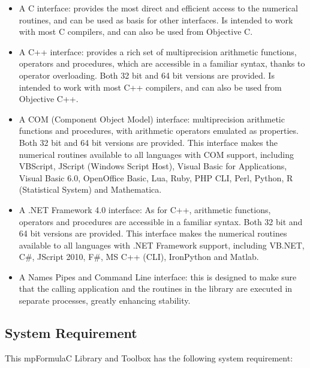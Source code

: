 \begin{itemize}	

\item A C interface: provides the most direct and efficient access to the numerical routines, and can be used as basis for other interfaces. Is intended to work with most C compilers, and can also be used from Objective C.
\item A C++ interface: provides a rich set of multiprecision arithmetic functions, operators and procedures, which are accessible in a familiar syntax, thanks to operator overloading. Both 32 bit and 64 bit versions are provided. Is intended to work with most C++ compilers, and can also be used from Objective C++.
\item A COM (Component Object Model) interface: multiprecision arithmetic functions and procedures, with arithmetic operators emulated as properties. Both 32 bit and 64 bit versions are provided. This interface makes the numerical routines available to all languages with COM support, including VBScript, JScript (Windows Script Host), Visual Basic for Applications, Visual Basic 6.0, OpenOffice  Basic, Lua, Ruby, PHP CLI, Perl, Python, R (Statistical System) and Mathematica.
\item A .NET Framework 4.0 interface: As for C++, arithmetic functions, operators and procedures are accessible in a familiar syntax. Both 32 bit and 64 bit versions are provided. This interface makes the numerical routines available to all languages with .NET Framework support, including VB.NET, C\#, JScript 2010, F\#, MS C++ (CLI), IronPython and Matlab.
\item A Names Pipes and Command Line interface: this is designed to make sure that the calling application and the routines in the library are executed in separate processes, greatly enhancing stability. 

\end{itemize}
	



\subsection{System Requirement}
\label{System Requirements}
This mpFormulaC Library and Toolbox has the following system requirement:

